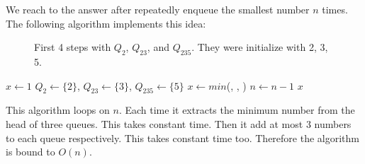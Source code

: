 \documentclass[b5paper]{article}
\begin{document}
We reach to the answer after repeatedly enqueue the smallest number $n$ times. The following algorithm implements this idea:

\begin{figure}[htbp]
  \centering
  \caption{First 4 steps with $Q_2$, $Q_{23}$, and $Q_{235}$. They were initialize with 2, 3, 5.}
  \label{fig:q235}
\end{figure}

\begin{algorithmic}[1]
  \State $x \gets 1$
  \State $Q_2 \gets \{ 2 \}$, $Q_{23} \gets \{ 3 \}$, $Q_{235} \gets \{ 5 \}$
    \State $x \gets min$(, , )
      \State {}
      \State {}
      \State {}
      \State {}
      \State {}
      \State {}
      \State {}
    \Else
      \State {}
      \State {}
    \EndIf
    \State $n \gets n - 1$
  \EndWhile
  \State \Return $x$
\EndFunction
\end{algorithmic}

This algorithm loops on $n$. Each time it extracts the minimum number from the head of three queues. This takes constant time. Then it add at most 3 numbers to each queue respectively. This takes constant time too. Therefore the algorithm is bound to $O(n)$.



\end{document}
